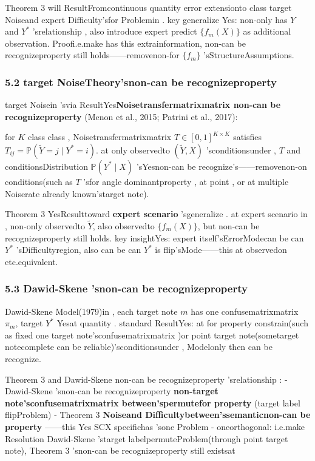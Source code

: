 \documentclass[
  12pt,
]{article}
\begin{document}
Theorem 3
will ResultFromcontinuous quantity error extensionto class target Noiseand expert Difficulty'sfor Problemin . key generalize Yes: non-only has 
\(Y\) and  \(Y^*\) 'srelationship , also introduce expert predict \(\{f_m(X)\}\)
as additional observation. Proofi.e.make has this extrainformation, non-can be recognizeproperty still holds------removenon-for 
\(\{f_m\}\) 'sStructureAssumptions. 

\subsubsection{5.2
target NoiseTheory'snon-can be recognizeproperty }\label{ux6807ux7b7eux566aux58f0ux7406ux8bbaux7684ux4e0dux53efux8bc6ux522bux6027}

target Noisein 'svia ResultYes\textbf{Noisetransfermatrixmatrix non-can be recognizeproperty }(Menon et al.,
2015; Patrini et al., 2017):

for  \(K\) class class , Noisetransfermatrixmatrix  \(T \in [0,1]^{K \times K}\) satisfies 
\(T_{ij} = \mathbb{P}(\tilde{Y} = j \mid Y^* = i)\). at only observedto 
\((\tilde{Y}, X)\) 'sconditionsunder , \(T\) and conditionsDistribution
\(\mathbb{P}(Y^* \mid X)\) 'sYesnon-can be recognize's------removenon-on conditions(such as 
\(T\) 'sfor angle dominantproperty , at point , or at multiple Noiserate already known'starget note). 

Theorem 3
YesResulttoward \textbf{expert scenario }'sgeneralize . at expert scenario in , non-only observedto 
\(\tilde{Y}\), also observedto 
\(\{f_m(X)\}\), but non-can be recognizeproperty still holds. key insightYes: expert itself'sErrorModecan be can 
\(Y^*\) 'sDifficultyregion, also can be can  \(Y^*\)
is flip'sMode------this at observedon etc.equivalent. 

\subsubsection{5.3 Dawid-Skene
'snon-can be recognizeproperty }\label{dawid-skene-ux7684ux4e0dux53efux8bc6ux522bux6027}

Dawid-Skene Model(1979)in , each target note \(m\) has one confusematrixmatrix 
\(\pi_m\), target  \(Y^*\)
Yesat quantity . standard ResultYes: at for property constrain(such as fixed one target note'sconfusematrixmatrix )or point target note(sometarget notecomplete can be reliable)'sconditionsunder , Modelonly then can be recognize. 

Theorem 3 and  Dawid-Skene non-can be recognizeproperty 'srelationship :  - Dawid-Skene
'snon-can be recognizeproperty \textbf{non-target note'sconfusematrixmatrix between'spermutefor property }(target label flipProblem)
- Theorem 3 \textbf{Noiseand Difficultybetween'ssemanticnon-can be property }------this Yes SCX
specifichas 'sone Problem - oneorthogonal: i.e.make Resolution Dawid-Skene
'starget labelpermuteProblem(through point target note), Theorem 3 'snon-can be recognizeproperty still existsat 
\end{document}
